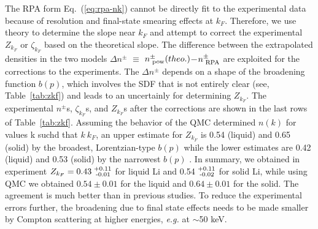 \documentclass[twocolumn,showpacs,showkeys,fleqn,prl,superscriptaddress]{revtex4}%
\newcommand{\nn}[1]{\textnormal{ #1}}
\begin{document}
The RPA form Eq.~(\ref{eq:rpa-nk}) cannot be directly fit to the experimental data because of resolution and final-state smearing effects at $k_F$.
Therefore, we use theory to determine the slope near $k_F$ and attempt to correct the experimental $Z_{k_F}$ or $\zeta_{k_F}$ based on the theoretical slope. 
The difference between the extrapolated densities in the two models $\Delta n^{\pm}$ $\equiv$ $n^{\pm}_{\nn{pow}} (theo.)$$-$$n^{\pm}_{\nn{RPA}}$ are exploited for the corrections to the experiments.
The $\Delta n^{\pm}$ depends on a shape of the broadening function $b(p)$, which involves the SDF that is not entirely clear (see, Table~\ref{tab:zkf}) and leads to an uncertainly for determining $Z_{k_F}$.
The experimental $n^{\pm}$s, $\zeta_{k_F}$s, and $Z_{k_F}$s after the corrections are shown in the last rows of Table~\ref{tab:zkf}.
Assuming the behavior of the  QMC determined $n(k)$ for values k suchd that $k ~ k_F$, an upper estimate for $Z_{k_F}$ is  0.54 (liquid) and 0.65 (solid) by the broadest, Lorentzian-type $b(p)$ while the lower estimates are 0.42 (liquid) and 0.53 (solid) by the narrowest $b(p)$ .
In summary, we obtained  in experiment $Z_{k_F}=  0.43^{\nn{+0.11}}_{\nn{\;-0.01}}$ for liquid Li and 0.54$^{\nn{+0.11}}_{\nn{\;-0.02}}$ for solid Li, while using QMC we obtained $0.54\pm0.01$ for the liquid and $0.64\pm0.01$ for the solid. 
The agreement is much better than in previous studies.
To reduce the experimental errors further, the broadening due to final state effects needs to be made smaller by Compton scattering at higher energies, {\it{e.g.}} at $\sim$50 keV.
\end{document}
